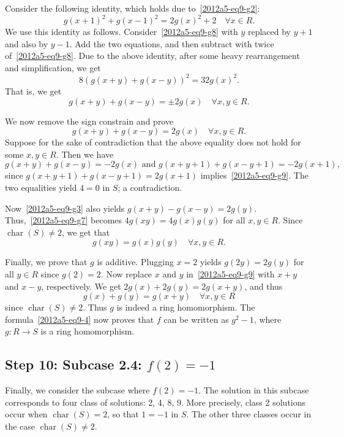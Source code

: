 \documentclass{article}
\DeclareMathOperator{\rchar}{char}
\begin{document}
Consider the following identity, which holds due to~\eqref{2012a5-eq9-g2}:
\[ g(x + 1)^2 + g(x - 1)^2 = 2 g(x)^2 + 2 \quad \forall x \in R. \]
We use this identity as follows.
Consider~\eqref{2012a5-eq9-g8} with $y$ replaced by $y + 1$ and also by $y - 1$.
Add the two equations, and then subtract with twice of~\eqref{2012a5-eq9-g8}.
Due to the above identity, after some heavy rearrangement and simplification, we get
\[ 8 (g(x + y) + g(x - y))^2 = 32 g(x)^2. \]
That is, we get
\[ g(x + y) + g(x - y) = \pm 2 g(x) \quad \forall x, y \in R. \]

We now remove the sign constrain and prove
\[ g(x + y) + g(x - y) = 2 g(x) \quad \forall x, y \in R. \tag{9.g9}\label{2012a5-eq9-g9} \]
Suppose for the sake of contradiction that the above equality does not hold for some $x, y \in R$.
Then we have
\[ g(x + y) + g(x - y) = -2 g(x) \text{ and } g(x + y + 1) + g(x - y + 1) = -2 g(x + 1), \]
    since $g(x + y + 1) + g(x - y + 1) = 2 g(x + 1)$ implies~\eqref{2012a5-eq9-g9}.
The two equalities yield $4 = 0$ in $S$; a contradiction.

Now~\eqref{2012a5-eq9-g3} also yields $g(x + y) - g(x - y) = 2 g(y)$.
Thus,~\eqref{2012a5-eq9-g7} becomes $4 g(xy) = 4 g(x) g(y)$ for all $x, y \in R$.
Since $\rchar(S) \neq 2$, we get that
\[ g(xy) = g(x) g(y) \quad \forall x, y \in R. \tag{9.g10}\label{2012a5-eq9-g10} \]

Finally, we prove that $g$ is additive.
Plugging $x = 2$ yields $g(2y) = 2g(y)$ for all $y \in R$ since $g(2) = 2$.
Now replace $x$ and $y$ in~\eqref{2012a5-eq9-g9} with $x + y$ and $x - y$, respectively.
We get $2 g(x) + 2 g(y) = 2 g(x + y)$, and thus
\[ g(x) + g(y) = g(x + y) \quad \forall x, y \in R \]
    since $\rchar(S) \neq 2$.
Thus $g$ is indeed a ring homomorphism.
The formula~\eqref{2012a5-eq9-4} now proves that $f$ can be written as $g^2 - 1$, where $g : R \to S$ is a ring homomorphism.









\subsection*{Step 10: Subcase 2.4: $f(2) = -1$}

Finally, we consider the subcase where $f(2) = -1$.
The solution in this subcase corresponds to four class of solutions: 2, 4, 8, 9.
More precisely, class 2 solutions occur when $\rchar(S) = 2$, so that $1 = -1$ in $S$.
The other three classes occur in the case $\rchar(S) \neq 2$.
\end{document}
